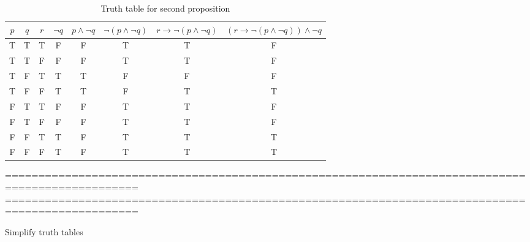 \documentclass[12pt,a4paper]{article}
\begin{document}
\begin{table}[h]
\centering
\begin{tabular}{|c|c|c|c|c|c|c|c|}
\hline
\( p \) & \( q \) & \( r \) & \( \neg q \) & \( p \land \neg q \) & \( \neg (p \land \neg q) \) & \( r \rightarrow \neg (p \land \neg q) \) & \( (r \rightarrow \neg (p \land \neg q)) \land \neg q \) \\
\hline
T & T & T & F & F & T & T & F \\
\hline
T & T & F & F & F & T & T & F \\
\hline
T & F & T & T & T & F & F & F \\
\hline
T & F & F & T & T & F & T & T \\
\hline
F & T & T & F & F & T & T & F \\
\hline
F & T & F & F & F & T & T & F \\
\hline
F & F & T & T & F & T & T & T \\
\hline
F & F & F & T & F & T & T & T \\
\hline
\end{tabular}
\caption{Truth table for second proposition}
\end{table}


==================================================================================================
\newpage
==================================================================================================

Simplify truth tables\\
\end{document}
